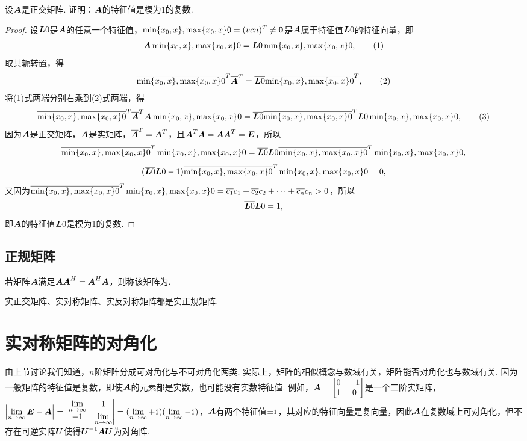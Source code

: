 \begin{example}
设\(\A\)是正交矩阵.
证明：\(\A\)的特征值是模为1的复数.
\begin{proof}
设\(\L0\)是\(\A\)的任意一个特征值，\(\X0=(\v{c}{n})^T\neq\z\)是\(\A\)属于特征值\(\L0\)的特征向量，即\begin{gather}
\A\X0=\L0\X0, \tag1
\end{gather}
取共轭转置，得\begin{gather}
\overline{\X0}^T \overline{\A}^T = \overline{\L0} \overline{\X0}^T, \tag2
\end{gather}
将(1)式两端分别右乘到(2)式两端，得\begin{gather}
\overline{\X0}^T \overline{\A}^T \A\X0 = \overline{\L0} \overline{\X0}^T \L0\X0, \tag3
\end{gather}
因为\(\A\)是正交矩阵，\(\A\)是实矩阵，\(\overline{\A}^T = \A^T\)，且\(\A^T\A=\A\A^T=\E\)，所以\[
\overline{\X0}^T \X0 = \overline{\L0} \L0 \overline{\X0}^T \X0,
\]\[
(\overline{\L0} \L0 - 1) \overline{\X0}^T \X0 = 0,
\]又因为\(\overline{\X0}^T \X0 = \overline{c_1}c_1 + \overline{c_2}c_2 + \dotsb + \overline{c_n}{c_n} > 0\)，所以\[
\overline{\L0} \L0 = 1,
\]即\(\A\)的特征值\(\L0\)是模为1的复数.
\end{proof}
\end{example}

\subsection{正规矩阵}
\begin{definition}
若矩阵\(\A\)满足\(\A\A^H = \A^H\A\)，则称该矩阵为.
\end{definition}

\begin{property}
实正交矩阵、实对称矩阵、实反对称矩阵都是实正规矩阵.
\end{property}

\section{实对称矩阵的对角化}
由上节讨论我们知道，\(n\)阶矩阵分成可对角化与不可对角化两类.
实际上，矩阵的相似概念与数域有关，矩阵能否对角化也与数域有关.
因为一般矩阵的特征值是复数，即使\(\A\)的元素都是实数，也可能没有实数特征值.
例如，\(\A = \begin{bmatrix} 0 & -1 \\ 1 & 0 \end{bmatrix}\)是一个二阶实矩阵，\(\abs{\l\E-\A}=\begin{vmatrix} \l & 1 \\ -1 & \l \end{vmatrix} = (\l+\iu)(\l-\iu)\)，\(\A\)有两个特征值\(\pm\iu\)，其对应的特征向量是复向量，因此\(\A\)在复数域上可对角化，但不存在可逆实阵\(\P\)使得\(\P^{-1}\A\P\)为对角阵.

